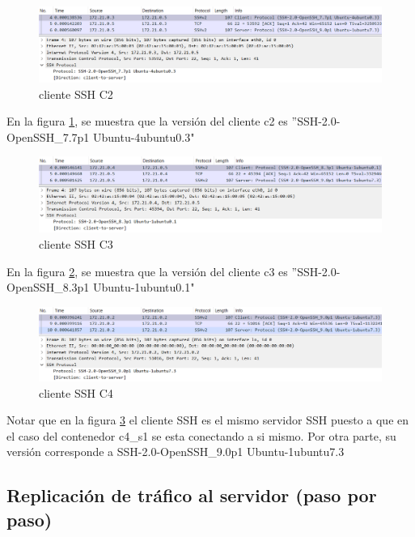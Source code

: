 \documentclass[letter,12pt]{article}
\begin{document}
\begin{figure}[ht]
    \centering
    \includegraphics[width=1\linewidth]{Images/parte2/clienteSSH/clienteC2.png}
    \caption{cliente SSH C2}
    \label{fig:clienteC2}
\end{figure}

En la figura \ref{fig:clienteC2}, se muestra que la versión del cliente c2 es ''SSH-2.0-OpenSSH\_7.7p1 Ubuntu-4ubuntu0.3"



\begin{figure}[ht]
    \centering
    \includegraphics[width=1\linewidth]{Images/parte2/clienteSSH/clienteC3.png}
    \caption{cliente SSH C3}
    \label{fig:clienteC3}
\end{figure}

En la figura \ref{fig:clienteC3}, se muestra que la versión del cliente c3 es ''SSH-2.0-OpenSSH\_8.3p1 Ubuntu-1ubuntu0.1"




\begin{figure}[ht]
    \centering
    \includegraphics[width=1\linewidth]{Images/parte2/clienteSSH/clienteC4.png}
    \caption{cliente SSH C4}
    \label{fig:clienteC4}
\end{figure}

Notar que en la figura \ref{fig:clienteC4} el cliente SSH es el mismo servidor SSH puesto a que en el caso del contenedor c4\_s1 se esta conectando a si mismo. Por otra parte, su versión corresponde a SSH-2.0-OpenSSH\_9.0p1 Ubuntu-1ubuntu7.3


\subsection{Replicación de tráfico al servidor (paso por paso)}
\end{document}
